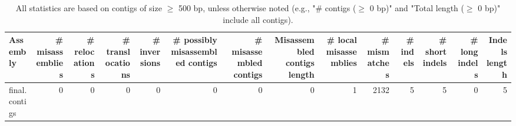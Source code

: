 \documentclass[12pt,a4paper]{article}
\begin{document}
\begin{table}[ht]
\begin{center}
\caption{All statistics are based on contigs of size $\geq$ 500 bp, unless otherwise noted (e.g., "\# contigs ($\geq$ 0 bp)" and "Total length ($\geq$ 0 bp)" include all contigs).}
\begin{tabular}{|l*{13}{|r}|}
\hline
Assembly & \# misassemblies &     \# relocations &     \# translocations &     \# inversions & \# possibly misassembled contigs & \# misassembled contigs & Misassembled contigs length & \# local misassemblies & \# mismatches & \# indels &     \# short indels &     \# long indels & Indels length \\ \hline
final.contigs & 0 & 0 & 0 & 0 & 0 & 0 & 0 & 1 & 2132 & 5 & 5 & 0 & 5 \\ \hline
\end{tabular}
\end{center}
\end{table}
\end{document}

